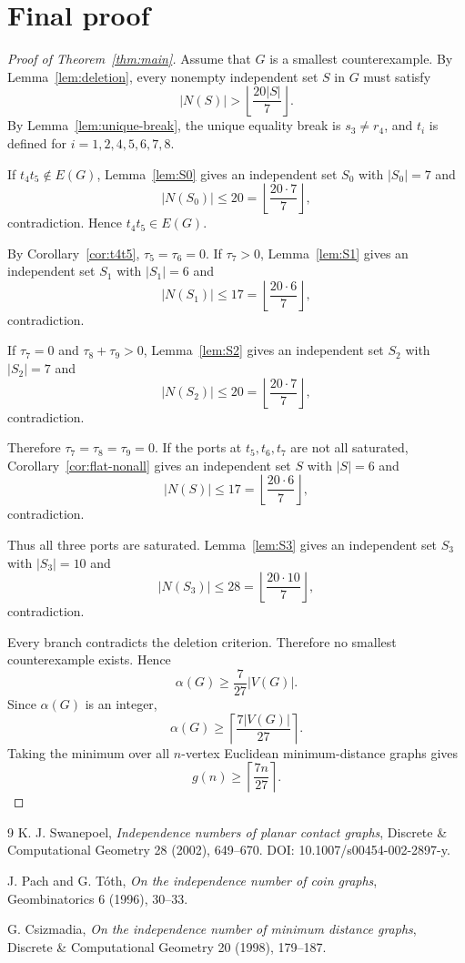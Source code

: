 \documentclass[11pt]{article}
\theoremstyle{plain}
\numberwithin{equation}{section}
\begin{document}
\section{Final proof}

\begin{proof}[Proof of Theorem~\ref{thm:main}]
Assume that $G$ is a smallest counterexample. By Lemma~\ref{lem:deletion}, every nonempty independent set $S$ in $G$ must satisfy
\[
 |N(S)|>\left\lfloor\frac{20|S|}{7}\right\rfloor.
\]
By Lemma~\ref{lem:unique-break}, the unique equality break is $s_3\ne r_4$, and $t_i$ is defined for $i=1,2,4,5,6,7,8$.

If $t_4t_5\notin E(G)$, Lemma~\ref{lem:S0} gives an independent set $S_0$ with $|S_0|=7$ and
\[
 |N(S_0)|\le20=\left\lfloor\frac{20\cdot7}{7}\right\rfloor,
\]
contradiction. Hence $t_4t_5\in E(G)$.

By Corollary~\ref{cor:t4t5}, $\tau_5=\tau_6=0$. If $\tau_7>0$, Lemma~\ref{lem:S1} gives an independent set $S_1$ with $|S_1|=6$ and
\[
 |N(S_1)|\le17=\left\lfloor\frac{20\cdot6}{7}\right\rfloor,
\]
contradiction.

If $\tau_7=0$ and $\tau_8+\tau_9>0$, Lemma~\ref{lem:S2} gives an independent set $S_2$ with $|S_2|=7$ and
\[
 |N(S_2)|\le20=\left\lfloor\frac{20\cdot7}{7}\right\rfloor,
\]
contradiction.

Therefore $\tau_7=\tau_8=\tau_9=0$. If the ports at $t_5,t_6,t_7$ are not all saturated, Corollary~\ref{cor:flat-nonall} gives an independent set $S$ with $|S|=6$ and
\[
 |N(S)|\le17=\left\lfloor\frac{20\cdot6}{7}\right\rfloor,
\]
contradiction.

Thus all three ports are saturated. Lemma~\ref{lem:S3} gives an independent set $S_3$ with $|S_3|=10$ and
\[
 |N(S_3)|\le28=\left\lfloor\frac{20\cdot10}{7}\right\rfloor,
\]
contradiction.

Every branch contradicts the deletion criterion. Therefore no smallest counterexample exists. Hence
\[
 \alpha(G)\ge\frac{7}{27}|V(G)|.
\]
Since $\alpha(G)$ is an integer,
\[
 \alpha(G)\ge\left\lceil\frac{7|V(G)|}{27}\right\rceil.
\]
Taking the minimum over all $n$-vertex Euclidean minimum-distance graphs gives
\[
 g(n)\ge \left\lceil\frac{7n}{27}\right\rceil.
\]
\end{proof}

\begin{thebibliography}{9}
K. J. Swanepoel,
\textit{Independence numbers of planar contact graphs},
Discrete \& Computational Geometry 28 (2002), 649--670.
DOI: 10.1007/s00454-002-2897-y.

J. Pach and G. T\'oth,
\textit{On the independence number of coin graphs},
Geombinatorics 6 (1996), 30--33.

G. Csizmadia,
\textit{On the independence number of minimum distance graphs},
Discrete \& Computational Geometry 20 (1998), 179--187.
\end{thebibliography}
\end{document}

